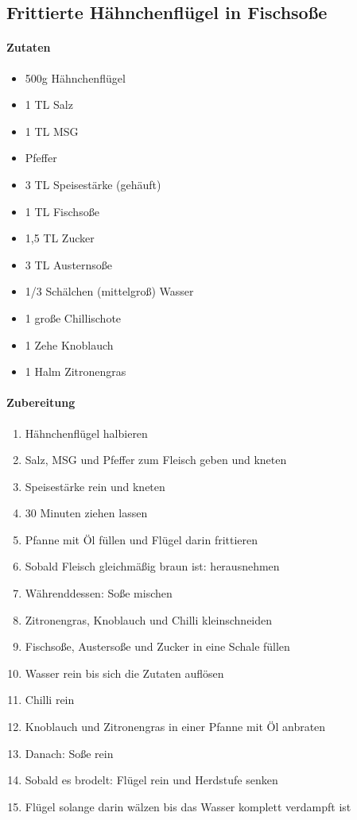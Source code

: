 \newpage
\subsection{Frittierte Hähnchenflügel in Fischsoße}
\paragraph{Zutaten}
\begin{itemize}[noitemsep]
	\item 500g Hähnchenflügel
	\item 1 TL Salz
	\item 1 TL MSG
	\item Pfeffer
	\item 3 TL Speisestärke (gehäuft)
	\item 1 TL Fischsoße
	\item 1,5 TL Zucker
	\item 3 TL Austernsoße
	\item 1/3 Schälchen (mittelgroß) Wasser
	\item 1 große Chillischote
	\item 1 Zehe Knoblauch
	\item 1 Halm Zitronengras
\end{itemize}
\paragraph{Zubereitung}
\begin{enumerate}[noitemsep]
	\item Hähnchenflügel halbieren 
	\item Salz, MSG und Pfeffer zum Fleisch geben und kneten
	\item Speisestärke rein und kneten
	\item 30 Minuten ziehen lassen
	\item Pfanne mit Öl füllen und Flügel darin frittieren
	\item Sobald Fleisch gleichmäßig braun ist: herausnehmen
	\item Währenddessen: Soße mischen
	\item Zitronengras, Knoblauch und Chilli kleinschneiden
	\item Fischsoße, Austersoße und Zucker in eine Schale füllen
	\item Wasser rein bis sich die Zutaten auflösen
	\item Chilli rein
	\item Knoblauch und Zitronengras in einer Pfanne mit Öl anbraten
	\item Danach: Soße rein
	\item Sobald es brodelt: Flügel rein und Herdstufe senken
	\item Flügel solange darin wälzen bis das Wasser komplett verdampft ist
\end{enumerate}
